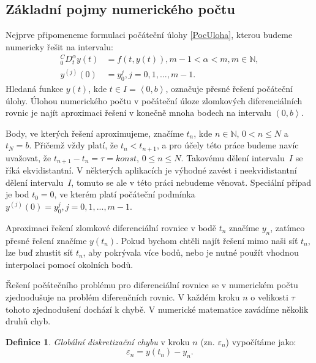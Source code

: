 \documentclass[a4paper,12pt,twoside]{article}
\theoremstyle{definition}
\newtheorem{defin}[veta]{Definice}
\theoremstyle{remark}
\numberwithin{equation}{section}
\numberwithin{table}{section}
\numberwithin{figure}{section}
\newcommand{\N}{\mathbb{N}}
\begin{document}
\subsection{Základní pojmy numerického počtu}
Nejprve připomeneme formulaci počáteční úlohy \eqref{PocUloha}, kterou budeme numericky řešit na intervalu:
\begin{equation*}
	\begin{aligned}
		^{C}_{0}D^{\alpha}_{t} y \left(t\right) &= f\left(t,y\left(t\right)\right), m-1 < \alpha < m, m \in \N, \\
		y^{\left(j\right)} \left(0\right) &= y_{0}^{j}, j=0,1,..., m-1.
	\end{aligned}	
\end{equation*}
Hledaná funkce $y\left(t\right)$, kde $t \in I = \left\langle0, b\right\rangle$, označuje přesné řešení počáteční úlohy. Úlohou numerického počtu v počáteční úloze zlomkových diferenciálních rovnic je najít aproximaci řešení v konečně mnoha bodech na intervalu $\left(0,b\right\rangle$. 

Body, ve kterých řešení aproximujeme, značíme $t_n$, kde $n \in \N$, $0<n\leq N$ a $t_N = b$. Přičemž vždy platí, že $t_n < t_{n+1}$, a pro účely této práce budeme navíc uvažovat, že $t_{n+1} - t_n = \tau = konst$, $ 0 \leq n \leq N$. Takovému dělení intervalu~$I$ se říká ekvidistantní. V některých aplikacích je výhodné zavést i neekvidistantní dělení intervalu~$I$, tomuto se ale v této práci nebudeme věnovat. Speciální případ je bod $t_0 = 0$, ve kterém platí počáteční podmínka $y^{\left(j\right)} \left(0\right) = y_{0}^{j}, j=0,1,..., m-1$.

Aproximaci řešení zlomkové diferenciální rovnice v bodě $t_n$ značíme $y_n$, zatímco přesné řešení značíme $y\left(t_n\right)$. Pokud bychom chtěli najít řešení mimo naši síť $t_n$, lze buď zhustit síť $t_n$, aby pokrývala více bodů, nebo je nutné použít vhodnou interpolaci pomocí okolních bodů.

Řešení počátečního problému pro diferenciální rovnice se v numerickém počtu zjednodušuje na problém diferenčních rovnic. V každém kroku $n$ o velikosti $\tau$ tohoto zjednodušení dochází k chybě. V numerické matematice zavádíme několik druhů chyb. %

\begin{defin}\label{GlobalniDiskretizacniChyba}
	\textit{Globální diskretizační chybu} v kroku $n$ (zn. $\varepsilon_{n}$) vypočítáme jako:
	$$\varepsilon_{n} = y\left(t_{n}\right) - y_{n}.$$
\end{defin}
\end{document}
